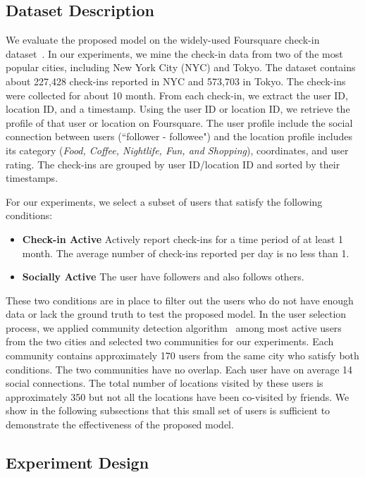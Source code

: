 \subsection{Dataset Description}

We evaluate the proposed model on the widely-used Foursquare check-in dataset~\cite{yang2015nationtelescope}. In our experiments, we mine the check-in data from two of the most popular cities, including New York City (NYC) and Tokyo. The dataset contains about 227,428 check-ins reported in NYC and 573,703 in Tokyo. The check-ins were collected for about 10 month. From each check-in, we extract the user ID, location ID, and a timestamp. Using the user ID or location ID, we retrieve the profile of that user or location on Foursquare. The user profile include the social connection between users (``follower - followee") and the location profile includes its category (\textit{Food, Coffee, Nightlife, Fun, and Shopping}), coordinates, and user rating. The check-ins are grouped by user ID/location ID and sorted by their timestamps.

For our experiments, we select a subset of users that satisfy the following conditions:
\begin{itemize}
\item \textbf{Check-in Active} Actively report check-ins for a time period of at least 1 month. The average number of check-ins reported per day is no less than 1.
\item \textbf{Socially Active} The user have followers and also follows others.
\end{itemize}
These two conditions are in place to filter out the users who do not have enough data or lack the ground truth to test the proposed model. In the user selection process, we applied community detection algorithm~\cite{fortunato2010community} among most active users from the two cities and selected two communities for our experiments. Each community contains approximately 170 users from the same city who satisfy both conditions. The two communities have no overlap. Each user have on average 14 social connections. The total number of locations visited by these users is approximately 350 but not all the locations have been co-visited by friends. We show in the following subsections that this small set of users is sufficient to demonstrate the effectiveness of the proposed model.

\subsection{Experiment Design}

